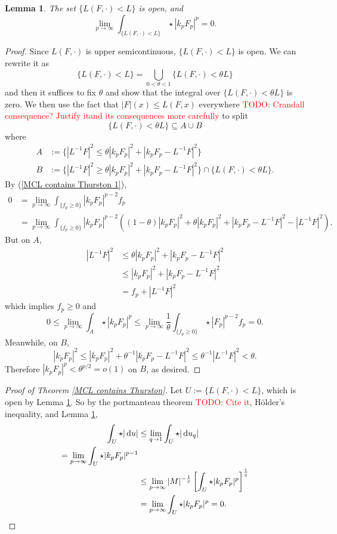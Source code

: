 \documentclass[reqno,11pt]{amsart}
\newcommand*\dif{\mathop{}\!\mathrm{d}}
\newtheorem{lemma}[theorem]{Lemma}
\theoremstyle{definition}
\numberwithin{equation}{section}
\newcommand\todo[1]{\textcolor{red}{TODO: #1}}
\begin{document}
\begin{lemma}\label{MCL contains Thurston lemma}
The set $\{L(F, \cdot) < L\}$ is open, and
$$\lim_{p \to \infty} \int_{\{L(F, \cdot) < L\}} \star |k_p F_p|^p = 0.$$
\end{lemma}
\begin{proof}
Since $L(F, \cdot)$ is upper semicontinuous, $\{L(F, \cdot) < L\}$ is open.
We can rewrite it as 
$$\{L(F, \cdot) < L\} = \bigcup_{0 < \theta < 1} \{L(F, \cdot) < \theta L\}$$
and then it suffices to fix $\theta$ and show that the integral over $\{L(F, \cdot) < \theta L\}$ is zero.
We then use the fact that $|F|(x) \leq L(F, x)$ everywhere \todo{Crandall consequence? Justify itand its consequences more carefully} to split
$$\{L(F, \cdot) < \theta L\} \subseteq A \cup B$$
where 
\begin{align*}
A &:= \{|L^{-1} F|^2 \leq \theta |k_p F_p|^2 + |k_p F_p - L^{-1} F|^2\} \\
B &:= \{|L^{-1} F|^2 \geq \theta |k_p F_p|^2 + |k_p F_p - L^{-1} F|^2\} \cap \{L(F, \cdot) < \theta L\} .
\end{align*}
By (\ref{MCL contains Thurston 1}),
\begin{align*}
0 &= \lim_{p \to \infty} \int_{\{f_p \geq 0\}} |k_p F_p|^{p - 2} f_p \\
&= \lim_{p \to \infty} \int_{\{f_p \geq 0\}} |k_p F_p|^{p - 2}((1 - \theta) |k_p F_p|^2 + \theta |k_p F_p|^2 + |k_p F_p - L^{-1} F|^2 - |L^{-1} F|^2).
\end{align*}
But on $A$,
\begin{align*}
|L^{-1} F|^2 &\leq \theta |k_p F_p|^2 + |k_p F_p - L^{-1} F|^2 \\
&\leq |k_p F_p|^2 + |k_p F_p - L^{-1} F|^2 \\
&= f_p + |L^{-1} F|^2
\end{align*}
which implies $f_p \geq 0$ and 
$$0 \leq \lim_{p \to \infty} \int_A \star |k_p F_p|^p \leq \lim_{p \to \infty} \frac{1}{\theta} \int_{\{f_p \geq 0\}} \star |F_p|^{p - 2} f_p = 0.$$
Meanwhile, on $B$,
$$|k_p F_p|^2 \leq |k_p F_p|^2 + \theta^{-1} |k_p F_p - L^{-1} F|^2 \leq \theta^{-1} |L^{-1} F|^2 < \theta.$$
Therefore $|k_p F_p|^p < \theta^{p/2} = o(1)$ on $B$, as desired.
\end{proof}

\begin{proof}[Proof of Theorem \ref{MCL contains Thurston}]
Let $U := \{L(F, \cdot) < L\}$, which is open by Lemma \ref{MCL contains Thurston lemma}.
So by the portmanteau theorem \todo{Cite it}, H\"older's inequality, and Lemma \ref{MCL contains Thurston lemma},
\begin{align*}
\int_U \star |\dif u|
&\leq \lim_{q \to 1} \int_U \star |\dif u_q| \\
= \lim_{p \to \infty} \int_U \star |k_p F_p|^{p - 1} \\
&\leq \lim_{p \to \infty} |M|^{-\frac{1}{p}} \left[\int_U \star |k_p F_p|^p\right]^{\frac{1}{q}} \\
&= \lim_{p \to \infty} \int_U \star |k_p F_p|^p = 0. \qedhere
\end{align*}
\end{proof}
\end{document}
